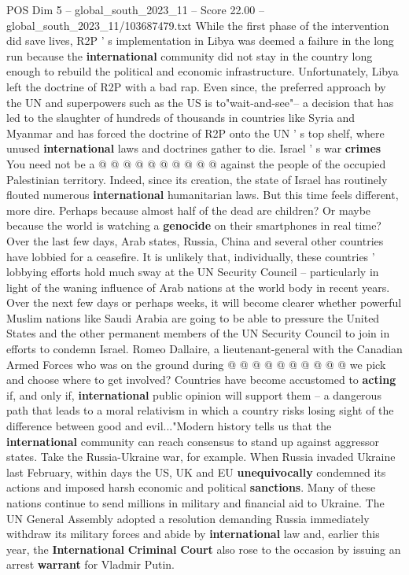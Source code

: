 \begin{textsample}{POS Dim 5 – global\_south\_2023\_11 – Score 22.00 – global\_south\_2023\_11/103687479.txt}
While the first phase of the intervention did save lives, R2P ' s implementation in Libya was deemed a failure in the long run because the \textbf{international} community did not stay in the country long enough to rebuild the political and economic infrastructure.
Unfortunately, Libya left the doctrine of R2P with a bad rap.
Even since, the preferred approach by the UN and superpowers such as the US is to"wait-and-see"-- a decision that has led to the slaughter of hundreds of thousands in countries like Syria and Myanmar and has forced the doctrine of R2P onto the UN ' s top shelf, where unused \textbf{international} laws and doctrines gather to die.
Israel ' s war \textbf{crimes} You need not be a @ @ @ @ @ @ @ @ @ @ against the people of the occupied Palestinian territory.
Indeed, since its creation, the state of Israel has routinely flouted numerous \textbf{international} humanitarian laws.
But this time feels different, more dire.
Perhaps because almost half of the dead are children?
Or maybe because the world is watching a \textbf{genocide} on their smartphones in real time?
Over the last few days, Arab states, Russia, China and several other countries have lobbied for a ceasefire.
It is unlikely that, individually, these countries ' lobbying efforts hold much sway at the UN Security Council -- particularly in light of the waning influence of Arab nations at the world body in recent years.
Over the next few days or perhaps weeks, it will become clearer whether powerful Muslim nations like Saudi Arabia are going to be able to pressure the United States and the other permanent members of the UN Security Council to join in efforts to condemn Israel.
Romeo Dallaire, a lieutenant-general with the Canadian Armed Forces who was on the ground during @ @ @ @ @ @ @ @ @ @ we pick and choose where to get involved?
Countries have become accustomed to \textbf{acting} if, and only if, \textbf{international} public opinion will support them -- a dangerous path that leads to a moral relativism in which a country risks losing sight of the difference between good and evil..."Modern history tells us that the \textbf{international} community can reach consensus to stand up against aggressor states.
Take the Russia-Ukraine war, for example.
When Russia invaded Ukraine last February, within days the US, UK and EU \textbf{unequivocally} condemned its actions and imposed harsh economic and political \textbf{sanctions}.
Many of these nations continue to send millions in military and financial aid to Ukraine.
The UN General Assembly adopted a resolution demanding Russia immediately withdraw its military forces and abide by \textbf{international} law and, earlier this year, the \textbf{International} \textbf{Criminal} \textbf{Court} also rose to the occasion by issuing an arrest \textbf{warrant} for Vladmir Putin.

\end{textsample}
